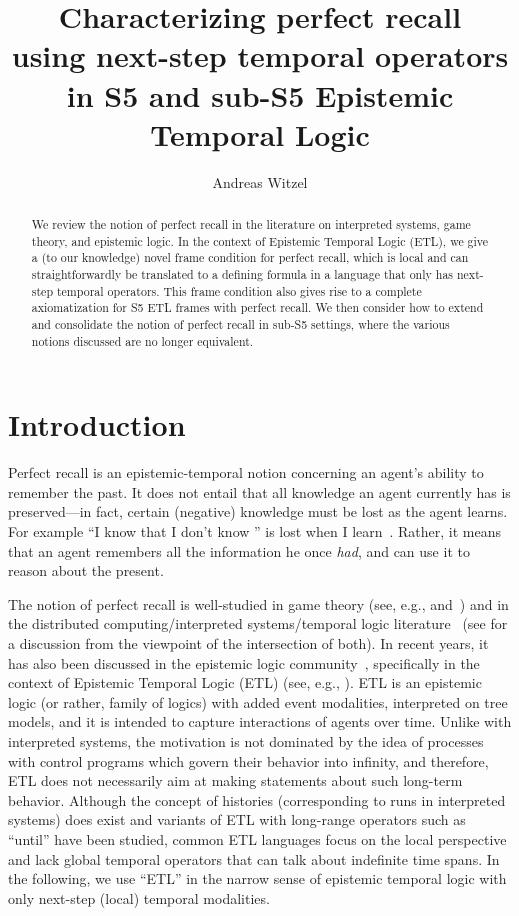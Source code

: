 \documentclass{article}
\author{Andreas Witzel}
\title{Characterizing perfect recall\\using next-step temporal operators\\in S5 and sub-S5 Epistemic Temporal Logic}
\newcounter{#1}
\begin{document}
\maketitle

\begin{abstract}
  We review the notion of perfect recall
  in the literature on interpreted systems, game theory, and epistemic logic.
  In the context of Epistemic Temporal Logic (ETL),
  we give a (to our knowledge) novel frame condition for perfect recall,
  which is local and can straightforwardly be translated to a defining formula
  in a language that only has next-step temporal operators.
  This frame condition also gives rise to a complete axiomatization for S5 ETL frames with perfect recall.
  We then consider how to extend and consolidate the notion of perfect recall in sub-S5 settings,
  where the various notions discussed are no longer equivalent.
\end{abstract}

\section{Introduction}
\label{sec:introduction}

Perfect recall is an epistemic-temporal notion concerning an agent's ability to remember the past.
It does not entail that all knowledge an agent currently has is preserved---in fact, certain (negative) knowledge must be lost as the agent learns.
For example ``I know that I don't know '' is lost when I learn~.
Rather, it means that an agent remembers all the information he once \emph{had},
and can use it to reason about the present.


The notion of perfect recall is well-studied in game theory
(see, e.g., \cite{piccione_absent-minded_1997} and~\cite[Section~11.1.3]{osborne_course_1994})
and in the distributed computing/interpreted systems/temporal logic literature~\cite{fagin_reasoning_1995,van_der_meyden_axioms_1993,van_der_meyden_complete_2003,halpern_complete_2004,parikh_knowledge_2003}
(see \cite{halpern_ambiguities_1997} for a discussion from the viewpoint of the intersection of both).
In recent years, it has also been discussed in the epistemic logic community~\cite{van_benthem_games_2001,van_benthem_tree_2006,van_benthem_merging_2009,isaac_synchronizing_2010},
specifically in the context of Epistemic Temporal Logic (ETL) (see, e.g., \cite{van_benthem_tree_2006}).
ETL is an epistemic logic (or rather, family of logics) with added event modalities, interpreted on tree models,
and it is intended to capture interactions of agents over time.
Unlike with interpreted systems, the motivation is not dominated by the idea
of processes with control programs which govern their behavior into infinity,
and therefore, ETL does not necessarily aim at making statements about such long-term behavior.
Although the concept of histories (corresponding to runs in interpreted systems) does exist
and variants of ETL with long-range operators such as ``until'' have been studied,
common ETL languages focus on the local perspective and lack global temporal operators
that can talk about indefinite time spans.
In the following, we use ``ETL'' in the narrow sense of epistemic temporal logic with only next-step (local) temporal modalities.
\end{document}
